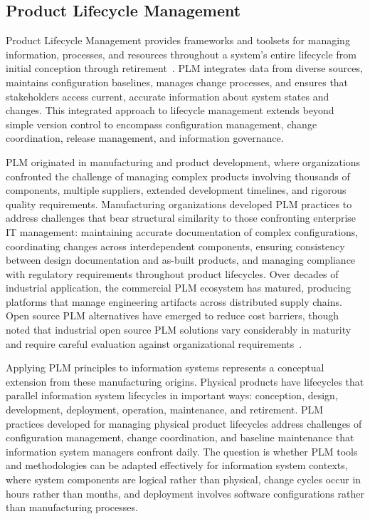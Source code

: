 \subsection{Product Lifecycle Management}

Product Lifecycle Management provides frameworks and toolsets for managing information, processes, and resources throughout a system's entire lifecycle from initial conception through retirement~\parencite{Ross_Winstead_McEvilley_2022}. PLM integrates data from diverse sources, maintains configuration baselines, manages change processes, and ensures that stakeholders access current, accurate information about system states and changes. This integrated approach to lifecycle management extends beyond simple version control to encompass configuration management, change coordination, release management, and information governance.

PLM originated in manufacturing and product development, where organizations confronted the challenge of managing complex products involving thousands of components, multiple suppliers, extended development timelines, and rigorous quality requirements. Manufacturing organizations developed PLM practices to address challenges that bear structural similarity to those confronting enterprise IT management: maintaining accurate documentation of complex configurations, coordinating changes across interdependent components, ensuring consistency between design documentation and as-built products, and managing compliance with regulatory requirements throughout product lifecycles. Over decades of industrial application, the commercial PLM ecosystem has matured, producing platforms that manage engineering artifacts across distributed supply chains.
Open source PLM alternatives have emerged to reduce cost barriers, though \citeauthor{Laili_2024} noted that industrial open source PLM solutions vary considerably in maturity and require careful evaluation against organizational requirements~\parencite{Laili_2024}.

Applying PLM principles to information systems represents a conceptual extension from these manufacturing origins. Physical products have lifecycles that parallel information system lifecycles in important ways: conception, design, development, deployment, operation, maintenance, and retirement. PLM practices developed for managing physical product lifecycles address challenges of configuration management, change coordination, and baseline maintenance that information system managers confront daily. The question is whether PLM tools and methodologies can be adapted effectively for information system contexts, where system components are logical rather than physical, change cycles occur in hours rather than months, and deployment involves software configurations rather than manufacturing processes.

